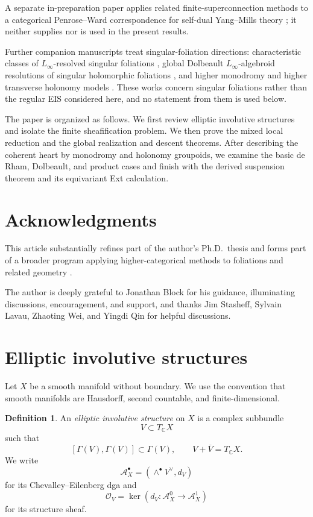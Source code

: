 \documentclass[12pt]{amsart}
\theoremstyle{definition}
\newtheorem{defn}[thm]{Definition}
\theoremstyle{remark}
\numberwithin{equation}{section}
\newcommand{\CA}{\mathcal A}
\newcommand{\CO}{\mathcal O}
\newcommand{\C}{\mathbb C}
\begin{document}
A separate in-preparation paper applies related finite-superconnection
methods to a categorical Penrose--Ward correspondence for self-dual
Yang--Mills theory \cite{ZengYangMills}; it neither supplies nor is used in
the present results.

Further companion manuscripts treat singular-foliation directions:
characteristic classes of \(L_\infty\)-resolved singular foliations
\cite{BlockZengCharacteristicClasses}, global Dolbeault
\(L_\infty\)-algebroid resolutions of singular holomorphic foliations
\cite{BlockWeiZengDolbeaultResolutions}, and higher monodromy and higher
transverse holonomy models
\cite{ZengHigherMonodromy,ZengHigherHolonomy}.  These works concern singular
foliations rather than the regular EIS considered here, and no statement
from them is used below.

The paper is organized as follows.  We first review elliptic involutive
structures and isolate the finite sheafification problem.  We then prove the
mixed local reduction and the global realization and descent theorems.
After describing the coherent heart by monodromy and holonomy groupoids, we
examine the basic de Rham, Dolbeault, and product cases and finish with the
derived suspension theorem and its equivariant Ext calculation.

\section*{Acknowledgments}

This article substantially refines part of the author's Ph.D.\ thesis
\cite{ZengThesis} and forms part of a broader program applying
higher-categorical methods to foliations and related geometry
\cite{ZengHigherRH,BlockZengCharacteristicClasses,ZengYangMills,
BlockWeiZengDolbeaultResolutions}.

The author is deeply grateful to Jonathan Block for his guidance,
illuminating discussions, encouragement, and support, and thanks Jim
Stasheff, Sylvain Lavau, Zhaoting Wei, and Yingdi Qin for helpful discussions.

\section{Elliptic involutive structures}

Let \(X\) be a smooth manifold without boundary.  We use the convention that
smooth manifolds are Hausdorff, second countable, and finite-dimensional.

\begin{defn}
An \emph{elliptic involutive structure} on \(X\) is a complex subbundle
\[
V\subset T_{\C}X
\]
such that
\[
[\Gamma(V),\Gamma(V)]\subset\Gamma(V),
\qquad
V+\overline V=T_{\C}X.
\]
We write
\[
\CA_X^\bullet=(\wedge^\bullet V^\vee,d_V)
\]
for its Chevalley--Eilenberg dga and
\[
\CO_V=\ker(d_V:\CA_X^0\longrightarrow\CA_X^1)
\]
for its structure sheaf.
\end{defn}
\end{document}
